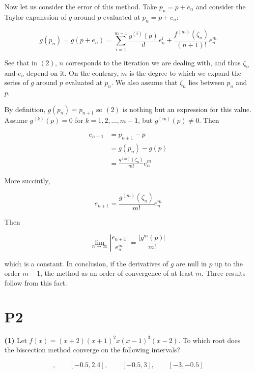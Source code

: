 \documentclass[12pt]{article}
\theoremstyle{definition}
\begin{document}
Now let us consider the error of this method. Take $p_n = p + e_n$ and consider
the Taylor expanssion of $g$ around $p$ evaluated at $p_n = p+e_n$:

\begin{equation}
    g(p_n) = g(p + e_n) = \sum_{i=1}^{m-1} \frac{ g^{(i)}(p) }{i!} e_n^{i} +
    \frac{f^{(m)}(\zeta_n)}{(n+1)!} e_{n}^{m}
\end{equation}

See that in $(2)$, $n$ corresponds to the iteration we are dealing with, and
thus $\zeta_n$ and $e_n$ depend on it. On the contrary, $m$ is the degree to
which we expand the series of $g$ around $p$ evaluated at $p_n$. We also assume
that $\zeta_n$ lies between $p_n$ and $p$.

By definition, $g(p_n) = p_{n+1}$ so $(2)$ is nothing but an expression for this
value. Assume $g^{(k)}(p) = 0$ for $k = 1, 2, \ldots, m-1$, but $g^{(m)}(p) \neq
0$. Then 

\begin{align*}
    e_{n+1} 
    &= p_{n+1} - p\\ 
    &=g(p_n) - g(p) \\ 
    &=\frac{ g^{(m)}\left( \zeta_n \right)  }{m!}e_n^m 
\end{align*}

More succintly,

\begin{equation*}
    e_{n+1} = \frac{ g^{(m)}\left( \zeta_n \right)  }{m!}e_n^m 
\end{equation*}

Then 

\begin{equation*}
    \lim_{n \to \infty} \left| \frac{e_{n+1}}{e_n^m} \right|  = 
    \frac{\left| g^m(p) \right| }{m!}
\end{equation*}

which is a constant. In conclusion, if the derivatives of $g$ are null in $p$ up
to the order $m-1$, the method as an order of convergence of at least $m$. Three
results follow from this fact. 

\pagebreak 


\section{P2}

\begin{shaded}
    \textbf{(1)} Let $f(x) = (x+2)(x+1)^2 x(x-1)^3(x-2)$. To which root does
    the biscection method converge on the following intervals? 

    \begin{equation*}
        [-1.5, 2.5], \qquad [-0.5, 2.4], \qquad [-0.5, 3], \qquad [-3, -0.5]
    \end{equation*}
\end{shaded}
\end{document}
